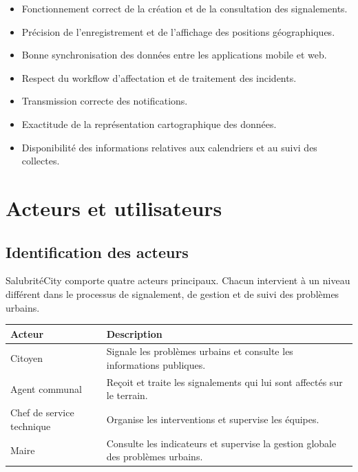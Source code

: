 \documentclass[11pt,a4paper,oneside]{report}
\begin{document}
	\begin{itemize}
		\item Fonctionnement correct de la création et de
		la consultation des signalements.
		
		\item Précision de l'enregistrement et de l'affichage
		des positions géographiques.
		
		\item Bonne synchronisation des données entre
		les applications mobile et web.
		
		\item Respect du workflow d'affectation et de
		traitement des incidents.
		
		\item Transmission correcte des notifications.
		
		\item Exactitude de la représentation cartographique
		des données.
		
		\item Disponibilité des informations relatives aux
		calendriers et au suivi des collectes.
	\end{itemize}
	
	
	
	\section{Acteurs et utilisateurs}
	
	\subsection{Identification des acteurs}
	
	SalubritéCity comporte quatre acteurs principaux.
	Chacun intervient à un niveau différent dans le
	processus de signalement, de gestion et de suivi
	des problèmes urbains.
	
	\begin{table}[h!]
		\centering
		\small
		\renewcommand{\arraystretch}{1.15}
		\begin{tabular}{|p{3.2cm}|p{10.8cm}|}
			\hline
			\textbf{Acteur} & \textbf{Description} \\ \hline
			Citoyen & Signale les problèmes urbains et consulte les informations publiques. \\ \hline
			Agent communal & Reçoit et traite les signalements qui lui sont affectés sur le terrain. \\ \hline
			Chef de service technique & Organise les interventions et supervise les équipes. \\ \hline
			Maire & Consulte les indicateurs et supervise la gestion globale des problèmes urbains. \\ \hline
		\end{tabular}
	\end{table}
	
\end{document}
